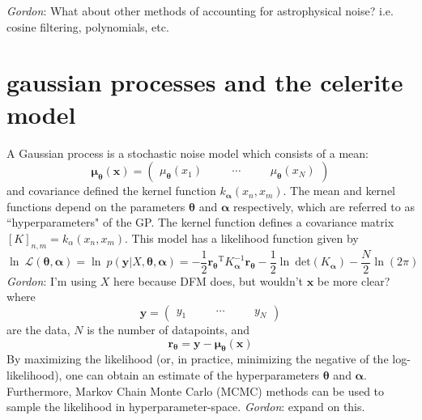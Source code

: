 \documentclass[modern]{aastex62}
\newcommand{\todo}[3]{{\color{#2}\emph{#1}: #3}}
\newcommand{\gordontodo}[1]{\todo{Gordon}{red}{#1}}
\newcommand{\bvec}[1]{{\ensuremath{\boldsymbol{#1}}}}
\newcommand{\T}{\ensuremath{\mathrm{T}}}
\newcommand{\expandvec}[2]{\left(\begin{array}{ccccc} #1\quad && \cdots\quad && #2 \end{array}\right)}
\begin{document}
	\gordontodo{What about other methods of accounting for astrophysical noise? i.e. cosine filtering, polynomials, etc.}
		
\section{gaussian processes and the celerite model}
	A Gaussian process is a stochastic noise model which consists of a mean:
	\begin{equation} 
		\bvec{\mu_\theta}(\bvec{x}) = \expandvec{\mu_\bvec{\theta}(x_1)}{\mu_\bvec{\theta}(x_N)}
	\end{equation}
	and covariance defined the kernel function $k_\bvec{\alpha}(x_n, x_m)$. The mean and kernel functions depend on the parameters 
	$\bvec{\theta}$ and $\bvec{\alpha}$ respectively, which are referred to as ``hyperparameters" of the GP. The kernel function defines a covariance matrix 
	$\left[K\right]_{n, m} = k_\alpha(x_n, x_m)$. This model has a likelihood function given by
	\begin{equation}
		\ln\ \mathcal{L(\bvec{\theta}, \bvec{\alpha})} = \ln\ p(\bvec{y}|X, \bvec{\theta}, \bvec{\alpha}) = 
			-\frac{1}{2}\bvec{r_\theta}^\T K_\bvec{\alpha}^{-1}\bvec{r_\theta} 
			-\frac{1}{2}\ln\ \mathrm{det}(K_\bvec{\alpha}) - \frac{N}{2}\ln(2\pi)
	\end{equation}
	\gordontodo{I'm using $X$ here because DFM does, but wouldn't $\bvec{x}$ be more clear?}
	where 
	\begin{equation}
		\bvec{y} = \expandvec{y_1}{y_N}
	\end{equation}
	are the data, $N$ is the number of datapoints, and
	\begin{equation}
		\bvec{r_\theta} = \bvec{y}-\bvec{\mu_\theta}(\bvec{x})
	\end{equation}
	By maximizing the likelihood (or, in practice, minimizing the negative of the log-likelihood), one can obtain an estimate of the hyperparameters $\bvec{\theta}$ and 
	$\bvec{\alpha}$. Furthermore, Markov Chain Monte Carlo (MCMC) methods can be used to sample the likelihood in hyperparameter-space. \gordontodo{expand 
	on this.}
\end{document}
